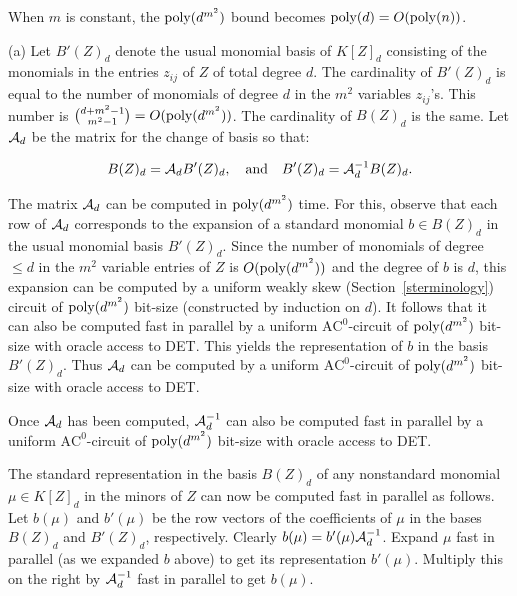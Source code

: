 \documentclass[11pt]{article}
\begin{document}
When $m$ is constant, the ${\mbox {poly}}(d^{m^2})$  bound becomes ${\mbox {poly}}(d)=O({\mbox {poly}}(n))$. 

\proof 

\noindent (a) 
Let $B'(Z)_d$ denote the usual monomial 
basis of $K[Z]_d$ consisting of the monomials in the entries  $z_{i j}$ of $Z$ of total degree $d$.
The cardinality of $B'(Z)_d$ is equal to 
the number of monomials  of degree $d$ in the $m^2$ variables $z_{i j}$'s. This number 
is  ${d + m^2 -1 \choose m^2 -1} = O({\mbox {poly}}(d^{m^2}))$.
The cardinality  of $B(Z)_d$ is the same.
Let ${\cal A}_d$ be the matrix for the change of basis so that:

\begin{equation} 
B(Z)_d = {\cal A}_d B'(Z)_d, \quad \mbox{and} \quad B'(Z)_d = {\cal A}_d^{-1} B(Z)_d.
\end{equation}

The matrix ${\cal A}_d$ can be computed in ${\mbox {poly}}(d^{m^2})$ time. 
For this, observe that each row of ${\cal A}_d$ 
corresponds to the expansion of a standard monomial $b\in B(Z)_d$ 
in the usual monomial basis $B'(Z)_d$.  Since the number of monomials of degree $\le d$ in the $m^2$ variable entries of 
$Z$ is $O({\mbox {poly}}(d^{m^2}))$ and the degree of $b$ is $d$, this expansion can be  computed 
by a uniform weakly skew (Section~\ref{sterminology}) circuit
of  ${\mbox {poly}}(d^{m^2})$ bit-size (constructed by induction on $d$). 
It follows \cite{malod} 
that it can also be computed  fast in parallel by a uniform  $\mbox{AC}^0$-circuit of ${\mbox {poly}}(d^{m^2})$ bit-size with oracle access to DET.
This yields the representation of $b$ in the basis $B'(Z)_d$.  Thus ${\cal A}_d$ can be computed by a uniform $\mbox{AC}^0$-circuit 
of ${\mbox {poly}}(d^{m^2})$ bit-size with oracle access to DET.

Once ${\cal A}_d$ has been computed, ${\cal A}_d^{-1}$  can also be computed fast in parallel \cite{malod} by a uniform  $\mbox{AC}^0$-circuit of 
${\mbox {poly}}(d^{m^2})$ bit-size with oracle access to DET.

The standard representation in the basis $B(Z)_d$ of any nonstandard monomial 
$\mu \in K[Z]_d$ in the minors of $Z$ can now be
computed fast in parallel as follows. Let $b(\mu)$ and $b'(\mu)$ be the row vectors of the coefficients of $\mu$ in
the bases  $B(Z)_d$ and $B'(Z)_d$, respectively. Clearly $b(\mu)=b'(\mu){\cal A}_d^{-1}$.
Expand $\mu$ fast in parallel (as we expanded $b$  above) to get its representation $b'(\mu)$. 
Multiply this on the right by ${\cal A}_d^{-1}$ fast in parallel to get $b(\mu)$.
\end{document}
